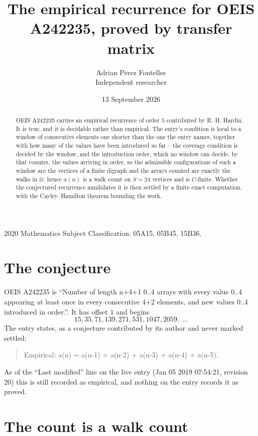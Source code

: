 \documentclass[11pt,a4paper]{article}
\title{The empirical recurrence for OEIS A242235, proved by transfer matrix}
\author{Adrian Perez Fontelles\\ \small Independent researcher}
\date{13 September 2026}
\theoremstyle{plain}
\theoremstyle{definition}
\begin{document}
\maketitle

\begin{abstract}
OEIS A242235 carries an empirical recurrence of order $5$ contributed by R. H. Hardin. It is
true, and it is decidable rather than empirical. The entry's condition is local to a window of consecutive elements one shorter than the one the entry names, together with how many of the values have been introduced so far -- the coverage condition is decided by the window, and the introduction order, which no window can decide, by that counter, the values arriving in order, so
the admissible configurations of such a window are the vertices of a finite digraph and the
arrays counted are exactly the walks in it; hence $a(n)$ is a walk count on $S=24$ vertices
and is $C$-finite. Whether the conjectured recurrence annihilates it is then settled by a
finite exact computation, with the Cayley--Hamilton theorem bounding the work.
\end{abstract}

\noindent\small 2020 Mathematics Subject Classification. 05A15, 05B45, 15B36.\normalsize

\section{The conjecture}

OEIS A242235 is ``Number of length n+4+1 0..4 arrays with every value 0..4 appearing at least once in every consecutive 4+2 elements, and new values 0..4 introduced in order.''. It has offset $1$ and begins
\[
15, 35, 71, 139, 271, 531, 1047, 2059,\ \dots
\]
The entry states, as a conjecture contributed by its author and never marked settled:
\begin{quote}
Empirical: a(n) = a(n-1) + a(n-2) + a(n-3) + a(n-4) + a(n-5).
\end{quote}
As of the ``Last modified'' line on the live entry (Jan 05 2019 07:54:21, revision 20) this is still
recorded as empirical, and nothing on the entry records it as proved.

\section{The count is a walk count}
\end{document}
